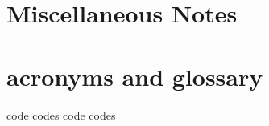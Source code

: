 \section{Miscellaneous Notes}



 







\section{acronyms and glossary}

\gls{code} %
\glspl{code} %
\Gls{code} %
\Glspl{code} %



